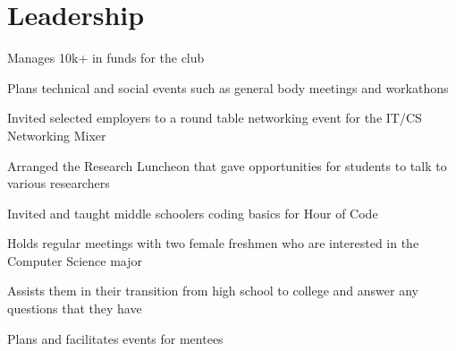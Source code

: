 \section{Leadership}

\begin{tightemize}
\item Manages 10k+ in funds for the club
\item Plans technical and social events such as general body meetings and workathons
\item Invited selected employers to a round table networking event for the {\selectfont IT/CS Networking Mixer}
\item Arranged the {\selectfont Research Luncheon} that gave opportunities for students to talk to various researchers
\item Invited and taught middle schoolers coding basics for {\selectfont Hour of Code}
\end{tightemize}

\begin{tightemize}
\item Holds regular meetings with two female freshmen who are interested in the Computer Science major
\item Assists them in their transition from high school to college and answer any questions that they have
\item Plans and facilitates events for mentees
\end{tightemize}
\sectionsep